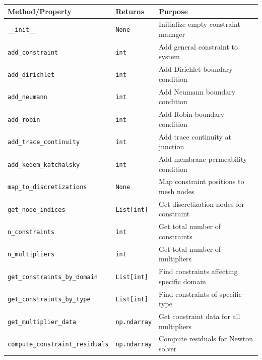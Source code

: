 \begin{longtable}{|p{5.5cm}|p{2cm}|p{6.5cm}|}
\hline
\textbf{Method/Property} & \textbf{Returns} & \textbf{Purpose} \\
\hline
\endhead

\texttt{\_\_init\_\_} & \texttt{None} & Initialize empty constraint manager \\
\hline

\texttt{add\_constraint} & \texttt{int} & Add general constraint to system \\
\hline

\texttt{add\_dirichlet} & \texttt{int} & Add Dirichlet boundary condition \\
\hline

\texttt{add\_neumann} & \texttt{int} & Add Neumann boundary condition \\
\hline

\texttt{add\_robin} & \texttt{int} & Add Robin boundary condition \\
\hline

\texttt{add\_trace\_continuity} & \texttt{int} & Add trace continuity at junction \\
\hline

\texttt{add\_kedem\_katchalsky} & \texttt{int} & Add membrane permeability condition \\
\hline

\texttt{map\_to\_discretizations} & \texttt{None} & Map constraint positions to mesh nodes \\
\hline

\texttt{get\_node\_indices} & \texttt{List[int]} & Get discretization nodes for constraint \\
\hline

\texttt{n\_constraints} & \texttt{int} & Get total number of constraints \\
\hline

\texttt{n\_multipliers} & \texttt{int} & Get total number of multipliers \\
\hline

\texttt{get\_constraints\_by\_domain} & \texttt{List[int]} & Find constraints affecting specific domain \\
\hline

\texttt{get\_constraints\_by\_type} & \texttt{List[int]} & Find constraints of specific type \\
\hline

\texttt{get\_multiplier\_data} & \texttt{np.ndarray} & Get constraint data for all multipliers \\
\hline

\texttt{compute\_constraint\_residuals} & \texttt{np.ndarray} & Compute residuals for Newton solver \\
\hline

\end{longtable}

